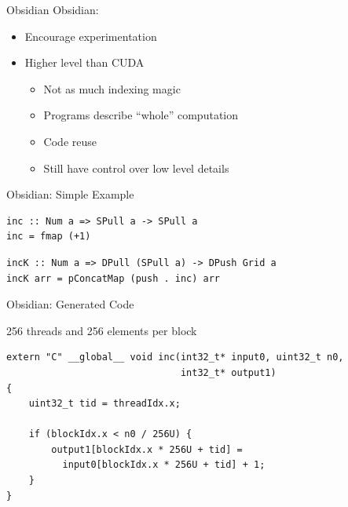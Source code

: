 \documentclass[xcolor=dvipsnames]{beamer}
\begin{document}
%

\begin{frame}{Obsidian} 
  Obsidian: 
  \begin{itemize} 
    \item Encourage experimentation
    \item Higher level than CUDA 
      \begin{itemize} 
        \item Not as much indexing magic
        \item Programs describe ``whole'' computation
        \item Code reuse 
        \item Still have control over low level details
      \end{itemize} 
  \end{itemize}  
\end{frame}

%

\begin{frame}[fragile]{Obsidian: Simple Example}

\begin{block}{} 
\begin{verbatim} 
inc :: Num a => SPull a -> SPull a
inc = fmap (+1)
\end{verbatim} 
\end{block} 

\pause 
\begin{block}{} 
\begin{verbatim} 
incK :: Num a => DPull (SPull a) -> DPush Grid a
incK arr = pConcatMap (push . inc) arr
\end{verbatim} 
\end{block} 


\end{frame} 

%
\newcommand\Fontvi{\fontsize{8}{7.2}\selectfont}

\begin{frame}[fragile]{Obsidian: Generated Code}
\begin{block}{256 threads and 256 elements per block} 
\Fontvi
\begin{verbatim} 
extern "C" __global__ void inc(int32_t* input0, uint32_t n0,
                               int32_t* output1)
{
    uint32_t tid = threadIdx.x;
     
    if (blockIdx.x < n0 / 256U) {
        output1[blockIdx.x * 256U + tid] = 
          input0[blockIdx.x * 256U + tid] + 1;
    }
}
\end{verbatim} 

\end{block}
\end{frame}
\end{document}
